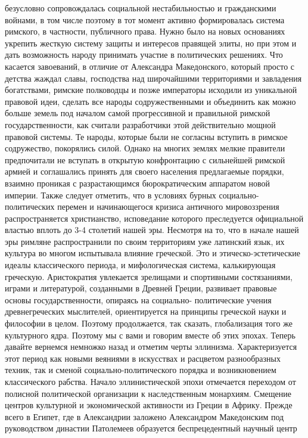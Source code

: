 безусловно сопровождалась социальной нестабильностью и гражданскими войнами, в
том числе поэтому в тот момент активно формировалась система римского, в
частности, публичного права. Нужно было на новых основаниях укрепить жесткую
систему защиты и интересов правящей элиты, но при этом и дать возможность народу
принимать участие в политических решениях. Что касается завоеваний, в отличие от
Александра Македонского, который просто с детства жаждал славы, господства над
широчайшими территориями и завладения богатствами, римские полководцы и позже
императоры исходили из уникальной правовой идеи, сделать все народы
содружественными и объединить как можно больше земель под началом самой
прогрессивной и правильной римской государственности, как считали разработчики
этой действительно мощной правовой системы. Те народы, которые были не согласны
вступить в римское содружество, покорялись силой. Однако на многих землях мелкие
правители предпочитали не вступать в открытую конфронтацию с сильнейшей римской
армией и соглашались принять для своего населения предлагаемые порядки, взаимно
проникая с разрастающимся бюрократическим аппаратом новой империи. Также следует
отметить, что в условиях бурных социально-политических перемен и начинающегося
кризиса античного мировоззрения распространяется христианство, исповедание
которого преследуется официальной властью вплоть до 3-4 столетий нашей эры.
Несмотря на то, что в начале нашей эры римляне распространили по своим
территориям уже латинский язык, их культура во многом испытывала влияние
греческой. Это и этическо-эстетические идеалы классического периода, и
мифологическая система, калькирующая греческую. Аристократия увлекается
зрелищами и спортивными состязаниями, играми и литературой, созданными в Древней
Греции, развивает правовые основы государственности, опираясь на социально-
политические учения древнегреческих мыслителей, ориентируется на принципы
греческой науки и философии в целом. Поэтому продолжается, так сказать,
глобализация того же культурного ядра. Поэтому мы с вами и говорим вместе об
этих эпохах. Теперь давайте вернемся немножко назад и отметим черты эллинизма.
Характеризуется этот период как новыми веяниями в искусствах и расцветом
разнообразных техник, так и сменой социально-политического порядка и
возникновением классического рабства. Начало эллинистической эпохи отмечается
переходом от полисной политической организации к наследственным монархиям.
Смещение центров культурной и экономической активности из Греции в Африку.
Прежде всего в Египет, где в Александрии заложено Александром Македонским под
руководством династии Патолемеев образуется беспрецедентный научный центр
